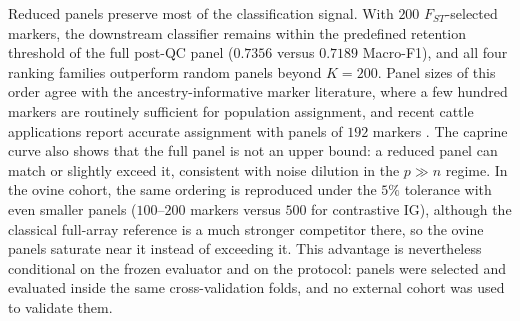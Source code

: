 Reduced panels preserve most of the classification signal. With
$200$ $F_{ST}$-selected markers, the downstream classifier remains
within the predefined retention threshold of the full post-QC panel
($0.7356$ versus $0.7189$ Macro-F1), and all four ranking families
outperform random panels beyond $K=200$. Panel sizes of this order
agree with the ancestry-informative marker literature, where a few
hundred markers are routinely sufficient for population assignment,
and recent cattle applications report accurate assignment with
panels of $192$ markers \cite{ahmad2024cattleassigner}. The caprine
curve also shows that the full panel is not an upper bound: a reduced
panel can match or slightly exceed it, consistent with noise dilution
in the $p\gg n$ regime. In the ovine cohort, the same ordering is
reproduced under the $5\%$ tolerance with even smaller panels
($100$--$200$ markers versus $500$ for contrastive IG), although the
classical full-array reference is a much stronger competitor there, so
the ovine panels saturate near it instead of exceeding it. This
advantage is nevertheless conditional on the frozen evaluator and on
the protocol: panels were selected and evaluated inside the same
cross-validation folds, and no external cohort was used to validate them.

